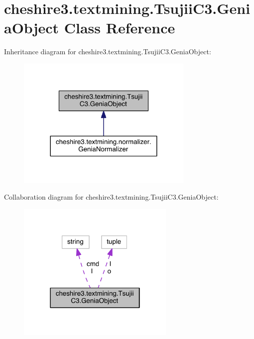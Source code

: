 \hypertarget{classcheshire3_1_1textmining_1_1_tsujii_c3_1_1_genia_object}{\section{cheshire3.\-textmining.\-Tsujii\-C3.\-Genia\-Object Class Reference}
\label{classcheshire3_1_1textmining_1_1_tsujii_c3_1_1_genia_object}
}


Inheritance diagram for cheshire3.\-textmining.\-Tsujii\-C3.\-Genia\-Object\-:
\nopagebreak
\begin{figure}[H]
\begin{center}
\leavevmode
\includegraphics[width=240pt]{classcheshire3_1_1textmining_1_1_tsujii_c3_1_1_genia_object__inherit__graph}
\end{center}
\end{figure}


Collaboration diagram for cheshire3.\-textmining.\-Tsujii\-C3.\-Genia\-Object\-:
\nopagebreak
\begin{figure}[H]
\begin{center}
\leavevmode
\includegraphics[width=214pt]{classcheshire3_1_1textmining_1_1_tsujii_c3_1_1_genia_object__coll__graph}
\end{center}
\end{figure}
